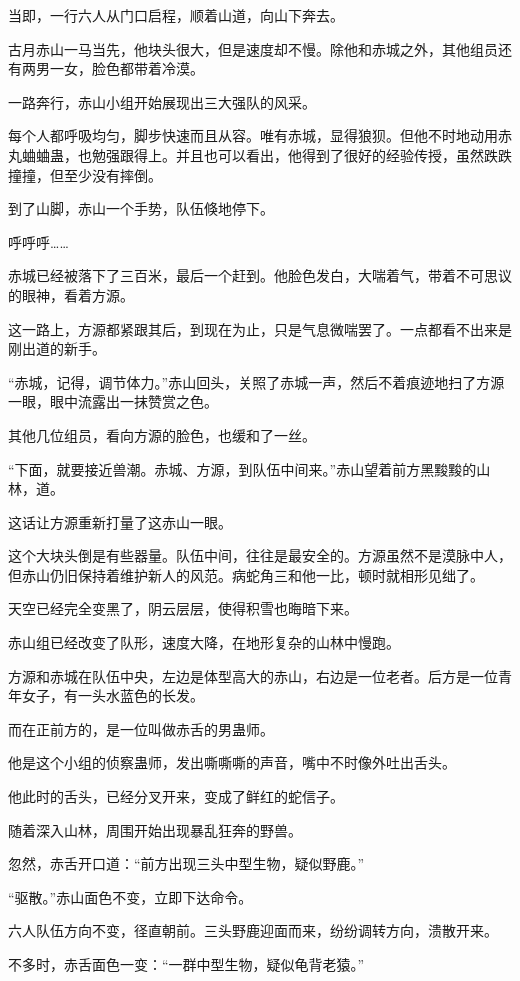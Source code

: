 \begin{this_body}
当即，一行六人从门口启程，顺着山道，向山下奔去。

古月赤山一马当先，他块头很大，但是速度却不慢。除他和赤城之外，其他组员还有两男一女，脸色都带着冷漠。

一路奔行，赤山小组开始展现出三大强队的风采。

每个人都呼吸均匀，脚步快速而且从容。唯有赤城，显得狼狈。但他不时地动用赤丸蛐蛐蛊，也勉强跟得上。并且也可以看出，他得到了很好的经验传授，虽然跌跌撞撞，但至少没有摔倒。

到了山脚，赤山一个手势，队伍倏地停下。

呼呼呼……

赤城已经被落下了三百米，最后一个赶到。他脸色发白，大喘着气，带着不可思议的眼神，看着方源。

这一路上，方源都紧跟其后，到现在为止，只是气息微喘罢了。一点都看不出来是刚出道的新手。

“赤城，记得，调节体力。”赤山回头，关照了赤城一声，然后不着痕迹地扫了方源一眼，眼中流露出一抹赞赏之色。

其他几位组员，看向方源的脸色，也缓和了一丝。

“下面，就要接近兽潮。赤城、方源，到队伍中间来。”赤山望着前方黑黢黢的山林，道。

这话让方源重新打量了这赤山一眼。

这个大块头倒是有些器量。队伍中间，往往是最安全的。方源虽然不是漠脉中人，但赤山仍旧保持着维护新人的风范。病蛇角三和他一比，顿时就相形见绌了。

天空已经完全变黑了，阴云层层，使得积雪也晦暗下来。

赤山组已经改变了队形，速度大降，在地形复杂的山林中慢跑。

方源和赤城在队伍中央，左边是体型高大的赤山，右边是一位老者。后方是一位青年女子，有一头水蓝色的长发。

而在正前方的，是一位叫做赤舌的男蛊师。

他是这个小组的侦察蛊师，发出嘶嘶嘶的声音，嘴中不时像外吐出舌头。

他此时的舌头，已经分叉开来，变成了鲜红的蛇信子。

随着深入山林，周围开始出现暴乱狂奔的野兽。

忽然，赤舌开口道：“前方出现三头中型生物，疑似野鹿。”

“驱散。”赤山面色不变，立即下达命令。

六人队伍方向不变，径直朝前。三头野鹿迎面而来，纷纷调转方向，溃散开来。

不多时，赤舌面色一变：“一群中型生物，疑似龟背老猿。”


\end{this_body}
